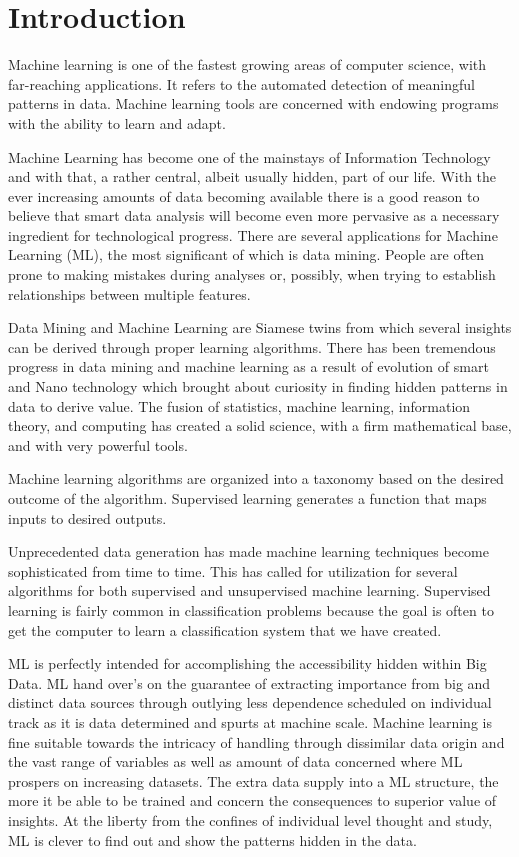 \documentclass[pdflatex,sn-nature,Numbered]{sn-jnl}%
\theoremstyle{thmstyleone}%
\theoremstyle{thmstyletwo}%
\theoremstyle{thmstylethree}%
\begin{document}
\section{Introduction}\label{sec1}

Machine learning is one of the fastest growing
areas of computer science, with far-reaching
applications. It refers to the automated detection of
meaningful patterns in data. Machine learning tools
are concerned with endowing programs with the
ability to learn and adapt. \cite{ref1}

Machine Learning has become one of the mainstays
of Information Technology and with that, a rather
central, albeit usually hidden, part of our life. With
the ever increasing amounts of data becoming
available there is a good reason to believe that smart
data analysis will become even more pervasive as a
necessary ingredient for technological progress.
There are several applications for Machine
Learning (ML), the most significant of which is data
mining. People are often prone to making mistakes
during analyses or, possibly, when trying to
establish relationships between multiple features. \cite{ref2}


Data Mining and Machine Learning are
Siamese twins from which several insights can be
derived through proper learning algorithms. There
has been tremendous progress in data mining and
machine learning as a result of evolution of smart
and Nano technology which brought about curiosity
in finding hidden patterns in data to derive value.
The fusion of statistics, machine learning,
information theory, and computing has created a
solid science, with a firm mathematical base, and
with very powerful tools.


Machine learning algorithms are organized into
a taxonomy based on the desired outcome of the
algorithm. Supervised learning generates a function
that maps inputs to desired outputs.


Unprecedented data generation has made
machine learning techniques become sophisticated
from time to time. This has called for utilization for
several algorithms for both supervised and
unsupervised machine learning. Supervised learning
is fairly common in classification problems because
the goal is often to get the computer to learn a
classification system that we have created. \cite{ref3}


ML is perfectly intended for accomplishing the
accessibility hidden within Big Data. ML hand
over’s on the guarantee of extracting importance from big and distinct data sources through outlying
less dependence scheduled on individual track as it
is data determined and spurts at machine scale.
Machine learning is fine suitable towards the
intricacy of handling through dissimilar data origin
and the vast range of variables as well as amount of
data concerned where ML prospers on increasing
datasets. The extra data supply into a ML structure,
the more it be able to be trained and concern the
consequences to superior value of insights. At the
liberty from the confines of individual level thought
and study, ML is clever to find out and show the
patterns hidden in the data. \cite{ref4}
\end{document}
